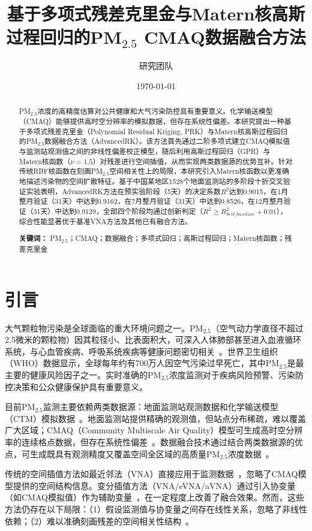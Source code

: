 \documentclass[UTF8, a4paper, 12pt]{article}
\title{基于多项式残差克里金与Matern核高斯过程回归的PM$_{2.5}$ CMAQ数据融合方法}
\author{研究团队}
\date{\today}
\begin{document}
\maketitle

\begin{abstract}
PM$_{2.5}$浓度的高精度估算对公共健康和大气污染防控具有重要意义。化学输送模型（CMAQ）能够提供高时空分辨率的模拟数据，但存在系统性偏差。本研究提出一种基于多项式残差克里金（Polynomial Residual Kriging, PRK）与Matern核高斯过程回归的PM$_{2.5}$数据融合方法（AdvancedRK）。该方法首先通过二阶多项式建立CMAQ模拟值与监测站观测值之间的非线性偏差校正模型，随后利用高斯过程回归（GPR）与Matern核函数（$\nu=1.5$）对残差进行空间插值，从而实现两类数据源的优势互补。针对传统RBF核函数在刻画PM$_{2.5}$空间相关性上的局限，本研究引入Matern核函数以更准确地描述污染物的空间扩散特征。基于中国某地区1528个地面监测站的多阶段十折交叉验证实验表明，AdvancedRK方法在预实验阶段（5天）的决定系数$R^2$达到0.9015，在1月整月验证（31天）中达到0.9162，在7月整月验证（31天）中达到0.8526，在12月整月验证（31天）中达到0.9129，全部四个阶段均通过创新判定（$R^2 \geq R^2_{best\_baseline} + 0.01$），综合性能显著优于基准VNA方法及其他已有融合方法。

\textbf{关键词：} PM$_{2.5}$；CMAQ；数据融合；多项式回归；高斯过程回归；Matern核函数；残差克里金
\end{abstract}

\section{引言}

大气颗粒物污染是全球面临的重大环境问题之一。PM$_{2.5}$（空气动力学直径不超过2.5微米的颗粒物）因其粒径小、比表面积大，可深入人体肺部甚至进入血液循环系统，与心血管疾病、呼吸系统疾病等健康问题密切相关~\cite{brooks2015review}。世界卫生组织（WHO）数据显示，全球每年约有700万人因空气污染过早死亡，其中PM$_{2.5}$是最主要的健康风险因子之一。实时准确的PM$_{2.5}$浓度监测对于疾病风险预警、污染防控决策和公众健康保护具有重要意义。

目前PM$_{2.5}$监测主要依赖两类数据源：地面监测站观测数据和化学输送模型（CTM）模拟数据~\cite{zheng2020kriging}。地面监测站提供精确的观测值，但站点分布稀疏，难以覆盖广大区域；CMAQ（Community Multiscale Air Quality）模型可生成高时空分辨率的连续格点数据，但存在系统性偏差~\cite{foley2010CMAQ}。数据融合技术通过结合两类数据源的优点，可生成既具有观测精度又覆盖空间全区域的高质量PM$_{2.5}$浓度数据~\cite{reich2014ensemble}。

传统的空间插值方法如最近邻法（VNA）直接应用于监测数据~\cite{singh2019enhanced}，忽略了CMAQ模型提供的空间结构信息。变分插值方法（VNA/eVNA/aVNA）通过引入协变量（如CMAQ模拟值）作为辅助变量~\cite{liu2019spatial}，在一定程度上改善了融合效果。然而，这些方法仍存在以下局限：（1）假设监测值与协变量之间存在线性关系，忽略了非线性依赖；（2）难以准确刻画残差的空间相关性结构~\cite{cooley2007kriging}。
\end{document}
